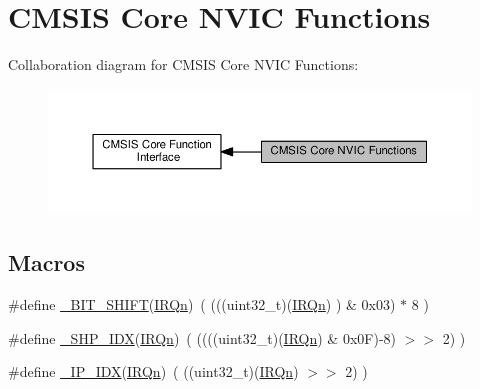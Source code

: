 \hypertarget{group___c_m_s_i_s___core___n_v_i_c_functions}{}\section{C\+M\+S\+IS Core N\+V\+IC Functions}
\label{group___c_m_s_i_s___core___n_v_i_c_functions}
Collaboration diagram for C\+M\+S\+IS Core N\+V\+IC Functions\+:\nopagebreak
\begin{figure}[H]
\begin{center}
\leavevmode
\includegraphics[width=350pt]{group___c_m_s_i_s___core___n_v_i_c_functions}
\end{center}
\end{figure}
\subsection*{Macros}
\begin{DoxyCompactItemize}
\item 
\#define \hyperlink{group___c_m_s_i_s___core___n_v_i_c_functions_ga53c75b28823441c6153269f0ecbed878}{\+\_\+\+B\+I\+T\+\_\+\+S\+H\+I\+FT}(\hyperlink{group___l_p_c11xx___c_m_s_i_s_ga666eb0caeb12ec0e281415592ae89083}{I\+R\+Qn})~(  (((uint32\+\_\+t)(\hyperlink{group___l_p_c11xx___c_m_s_i_s_ga666eb0caeb12ec0e281415592ae89083}{I\+R\+Qn})       )    \&  0x03) $\ast$ 8 )
\item 
\#define \hyperlink{group___c_m_s_i_s___core___n_v_i_c_functions_gaee4f7eb5d7e770ad51489dbceabb1755}{\+\_\+\+S\+H\+P\+\_\+\+I\+DX}(\hyperlink{group___l_p_c11xx___c_m_s_i_s_ga666eb0caeb12ec0e281415592ae89083}{I\+R\+Qn})~( ((((uint32\+\_\+t)(\hyperlink{group___l_p_c11xx___c_m_s_i_s_ga666eb0caeb12ec0e281415592ae89083}{I\+R\+Qn}) \& 0x0\+F)-\/8) $>$$>$    2)     )
\item 
\#define \hyperlink{group___c_m_s_i_s___core___n_v_i_c_functions_ga370ec4b1751a6a889d849747df3763a9}{\+\_\+\+I\+P\+\_\+\+I\+DX}(\hyperlink{group___l_p_c11xx___c_m_s_i_s_ga666eb0caeb12ec0e281415592ae89083}{I\+R\+Qn})~(   ((uint32\+\_\+t)(\hyperlink{group___l_p_c11xx___c_m_s_i_s_ga666eb0caeb12ec0e281415592ae89083}{I\+R\+Qn})            $>$$>$    2)     )
\end{DoxyCompactItemize}



